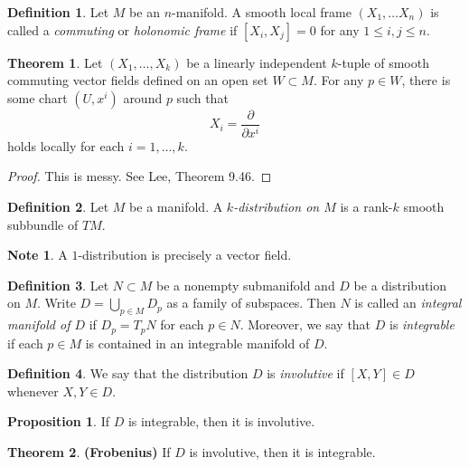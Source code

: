 \documentclass[10pt,letterpaper,cm]{nupset}
\theoremstyle{definition}
\newtheorem*{definition}{Definition}
\newtheorem{theorem}{Theorem}
\newtheorem*{note}{Note}
\newtheorem{prop}{Proposition}
\newcommand{\1}{\mathbf{1}}
\newcommand{\0}{\vec 0}
\begin{document}
\begin{definition}
Let $M$ be an $n$-manifold. A smooth local frame $(X_1, \ldots X_n)$ is called a \textit{commuting} or \textit{holonomic frame} if $[X_i, X_j]=0$ for any $1\leq i,j\leq n$.
\end{definition}

\begin{theorem}
Let $(X_1, \ldots, X_k)$ be a linearly independent $k$-tuple of smooth commuting vector fields defined on an open set $W\subset M$. For any $p\in W$, there is some chart $(U, x^i)$ around $p$ such that $$X_i = \frac{\partial}{\partial{x^i}}$$ holds locally for each $i=1, \ldots, k$.
\end{theorem}
\begin{proof}
This is messy. See Lee, Theorem 9.46.
\end{proof}

\begin{definition}
Let $M$ be a manifold. A \textit{$k$-distribution on $M$} is a rank-$k$ smooth subbundle of $TM$.
\end{definition}
\begin{note}
A $1$-distribution is precisely a vector field. 
\end{note}

\begin{definition}
Let $N\subset M$ be a nonempty submanifold and $D$ be a distribution on $M$. Write $D = \bigcup_{p\in M}D_p$ as a family of subspaces. Then $N$ is called an \textit{integral manifold of $D$} if $D_p = T_pN$ for each $p\in N$. Moreover, we say that $D$ is \textit{integrable} if each $p\in M$ is contained in an integrable manifold of $D$.  
\end{definition}

\begin{definition}
We say that the distribution $D$ is \textit{involutive} if $[X,Y]\in D$ whenever $X,Y \in D$. 
\end{definition}

\begin{prop}
If $D$ is integrable, then it is involutive.
\end{prop}

\begin{theorem}{\textbf{(Frobenius)}}
If $D$ is involutive, then it is integrable. 
\end{theorem}
\end{document}
